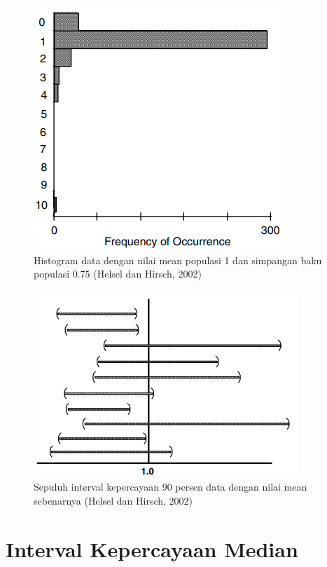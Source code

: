 \documentclass[]{book}
\begin{document}
\begin{figure}

{\centering \includegraphics[width=0.7\linewidth]{iiedata} 

}

\caption{Histogram data dengan nilai mean populasi 1 dan simpangan baku populasi 0.75 (Helsel dan Hirsch, 2002)}\label{fig:iiedata}
\end{figure}

\begin{figure}

{\centering \includegraphics[width=0.65\linewidth]{iievis2} 

}

\caption{Sepuluh interval kepercayaan 90 persen data dengan nilai mean sebenarnya  (Helsel dan Hirsch, 2002)}\label{fig:iievis2}
\end{figure}

\section{Interval Kepercayaan Median}\label{interval-kepercayaan-median}
\end{document}
